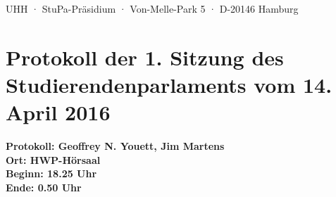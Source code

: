 \documentclass[ngerman,headheight=70pt]{scrartcl}
\begin{document}
    UHH · StuPa-Präsidium · Von-Melle-Park 5 · D-20146 Hamburg

    \section*{Protokoll der 1. Sitzung des Studierendenparlaments vom 14. April 2016}

    \textbf{Protokoll: Geoffrey N. Youett, Jim Martens}\\
    \textbf{Ort: HWP-Hörsaal}\\
    \textbf{Beginn: 18.25 Uhr}\\
    \textbf{Ende: 0.50 Uhr}

    \vspace{0.5cm}
\end{document}
